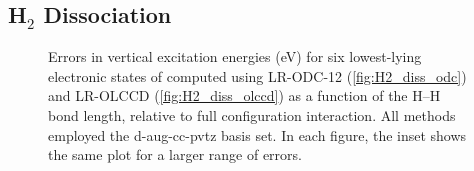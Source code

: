 \subsection{H$_2$ Dissociation}
\label{sec:two_electron}

\begin{figure}[h!]
    \centering
     \qquad
     \quad
    \captionsetup{justification=raggedright,singlelinecheck=false}
    \caption{%
        \label{fig:H2_diss}
        Errors in vertical excitation energies (eV) for six lowest-lying
        electronic states of  computed using LR-ODC-12
        (\ref{fig:H2_diss_odc}) and LR-OLCCD (\ref{fig:H2_diss_olccd}) as a
        function of the H--H bond length, relative to full configuration
        interaction.
        All methods employed the d-aug-cc-pvtz basis set.
        In each figure, the inset shows the same plot for a larger range of
        errors.
    }
\end{figure}

